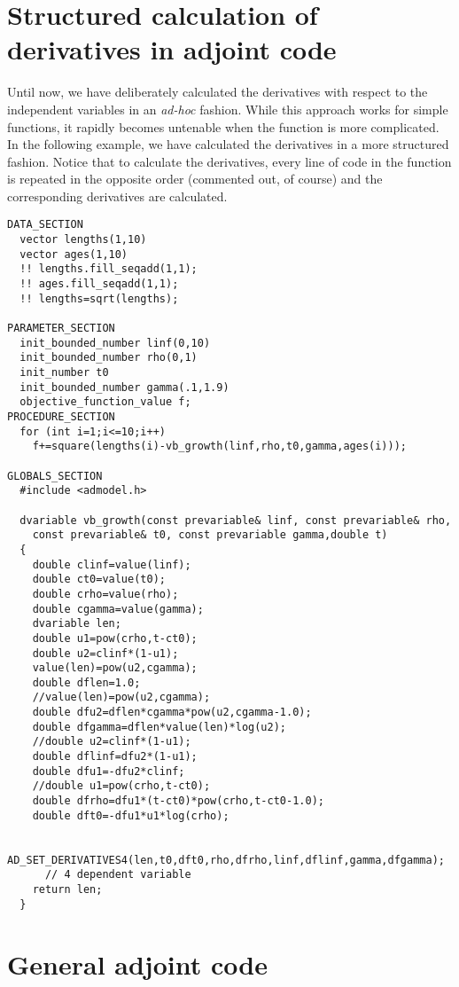 \section{Structured calculation of derivatives in adjoint code}

Until now, we have deliberately calculated the derivatives with respect to the independent
variables in an {\it ad-hoc} fashion. While this approach works for simple functions,
it rapidly becomes untenable when the function is more complicated. In the following example,
we have calculated the derivatives in a more structured fashion. Notice that to calculate the
derivatives, every line of code in the function is repeated in the opposite
order (commented out, of course) and the corresponding derivatives are calculated.
\begin{lstlisting}
DATA_SECTION
  vector lengths(1,10)
  vector ages(1,10)
  !! lengths.fill_seqadd(1,1);
  !! ages.fill_seqadd(1,1);
  !! lengths=sqrt(lengths);

PARAMETER_SECTION
  init_bounded_number linf(0,10) 
  init_bounded_number rho(0,1) 
  init_number t0 
  init_bounded_number gamma(.1,1.9) 
  objective_function_value f;
PROCEDURE_SECTION
  for (int i=1;i<=10;i++)
    f+=square(lengths(i)-vb_growth(linf,rho,t0,gamma,ages(i)));
  
GLOBALS_SECTION
  #include <admodel.h>

  dvariable vb_growth(const prevariable& linf, const prevariable& rho, 
    const prevariable& t0, const prevariable gamma,double t)
  {
    double clinf=value(linf);
    double ct0=value(t0);
    double crho=value(rho);
    double cgamma=value(gamma);
    dvariable len;
    double u1=pow(crho,t-ct0);
    double u2=clinf*(1-u1); 
    value(len)=pow(u2,cgamma);
    double dflen=1.0;
    //value(len)=pow(u2,cgamma);
    double dfu2=dflen*cgamma*pow(u2,cgamma-1.0);
    double dfgamma=dflen*value(len)*log(u2);
    //double u2=clinf*(1-u1); 
    double dflinf=dfu2*(1-u1);
    double dfu1=-dfu2*clinf;
    //double u1=pow(crho,t-ct0);
    double dfrho=dfu1*(t-ct0)*pow(crho,t-ct0-1.0);
    double dft0=-dfu1*u1*log(crho);

    AD_SET_DERIVATIVES4(len,t0,dft0,rho,dfrho,linf,dflinf,gamma,dfgamma);  
      // 4 dependent variable 
    return len;
  }
\end{lstlisting}


\section{General adjoint code}

